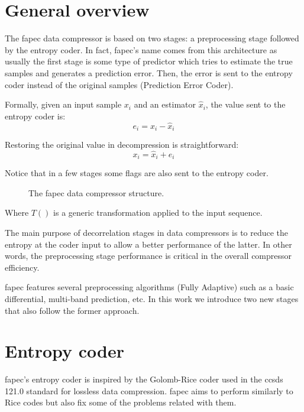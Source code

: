 \section{General overview}
The \acrshort{fapec} data compressor is based on two stages: a preprocessing stage followed by the entropy coder. In fact, \acrshort{fapec}'s name comes from this architecture as usually the first stage is some type of predictor which tries to estimate the true samples and generates a prediction error. Then, the error is sent to the entropy coder instead of the original samples (Prediction Error Coder).

Formally, given an input sample $x_i$ and an estimator $\hat{x}_i$, the value sent to the entropy coder is:
\begin{equation}
e_i = x_i - \hat{x}_i
\end{equation}

Restoring the original value in decompression is straightforward:
\begin{equation}
x_i = \hat{x}_i + e_i
\end{equation}

Notice that in a few stages some flags are also sent to the entropy coder.

\begin{figure}[h!]
	\begin{center}
		\scalebox{.565}{}
	\end{center}
	\caption{The \acrshort{fapec} data compressor structure.}
	\label{fig:fapec_structure}
\end{figure}

Where $T()$ is a generic transformation applied to the input sequence.

The main purpose of decorrelation stages in data compressors is to reduce the entropy at the coder input to allow a better performance of the latter. In other words, the preprocessing stage performance is critical in the overall compressor efficiency.

\acrshort{fapec} features several preprocessing algorithms (Fully Adaptive) such as a basic differential, multi-band prediction, etc. In this work we introduce two new stages that also follow the former approach.

\section{Entropy coder}
\acrshort{fapec}'s entropy coder is inspired by the Golomb-Rice coder used in the \acrshort{ccsds} 121.0 standard for lossless data compression. \acrshort{fapec} aims to perform similarly to Rice codes but also fix some of the problems related with them.

